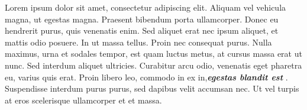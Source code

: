 Lorem ipsum dolor sit amet, consectetur adipiscing elit. Aliquam vel vehicula magna, ut egestas magna. Praesent bibendum porta ullamcorper. Donec eu hendrerit purus, quis venenatis enim. Sed aliquet erat nec ipsum aliquet, et mattis odio posuere. In ut massa tellus. Proin nec consequat purus. Nulla maximus, urna et sodales tempor, est quam luctus metus, at cursus massa erat ut nunc. Sed interdum aliquet ultricies. Curabitur arcu odio, venenatis eget pharetra eu, varius quis erat. Proin libero leo, commodo in ex in,\textbf{\textit{egestas blandit est}} . Suspendisse interdum purus purus, sed dapibus velit accumsan nec. Ut vel turpis at eros scelerisque ullamcorper et et massa.